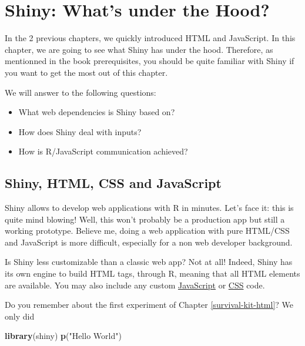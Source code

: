 \documentclass[]{book}
\newenvironment{Shaded}{\begin{snugshade}}{\end{snugshade}}
\newcommand{\KeywordTok}[1]{\textcolor[rgb]{0.13,0.29,0.53}{\textbf{#1}}}
\newcommand{\NormalTok}[1]{#1}
\newcommand{\StringTok}[1]{\textcolor[rgb]{0.31,0.60,0.02}{#1}}
\providecommand{\tightlist}{%
  \setlength{\itemsep}{0pt}\setlength{\parskip}{0pt}}
\begin{document}
\hypertarget{survival-kit-shiny}{%
\chapter{Shiny: What's under the Hood?}\label{survival-kit-shiny}}

In the 2 previous chapters, we quickly introduced HTML and JavaScript. In this chapter, we are going to see what Shiny has under the hood. Therefore, as mentionned in the book prerequisites, you should be quite familiar with Shiny if you want to get the most out of this chapter.

We will answer to the following questions:

\begin{itemize}
\tightlist
\item
  What web dependencies is Shiny based on?
\item
  How does Shiny deal with inputs?
\item
  How is R/JavaScript communication achieved?
\end{itemize}

\hypertarget{shiny-html-css-and-javascript}{%
\section{Shiny, HTML, CSS and JavaScript}\label{shiny-html-css-and-javascript}}

Shiny allows to develop web applications with R in minutes. Let's face it: this is quite mind blowing! Well, this won't probably be a production app but still a working prototype. Believe me, doing a web application with pure HTML/CSS and JavaScript is more difficult, especially for a non web developer background.

Is Shiny less customizable than a classic web app? Not at all! Indeed, Shiny has its own engine to build HTML tags, through R, meaning that all HTML elements are available. You may also include any custom \href{https://shiny.rstudio.com/articles/packaging-javascript.html}{JavaScript} or \href{https://mastering-shiny.org/advanced-ui.html}{CSS} code.

Do you remember about the first experiment of Chapter \ref{survival-kit-html}? We only did

\begin{Shaded}
\begin{Highlighting}[]
\KeywordTok{library}\NormalTok{(shiny)}
\KeywordTok{p}\NormalTok{(}\StringTok{"Hello World"}\NormalTok{)}
\end{Highlighting}
\end{Shaded}
\end{document}
